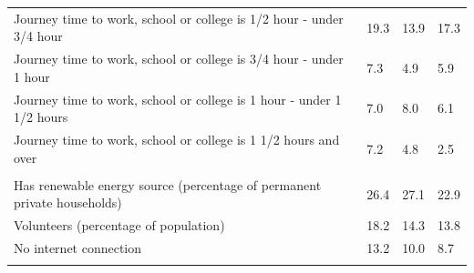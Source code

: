 \documentclass{article}
\begin{document}
\begin{table}[h]
\begin{tabular}{KTTT}
Journey time to work, school or college is 1/2 hour - under 3/4 hour & 19.3& 13.9& 17.3\\
Journey time to work, school or college is 3/4 hour - under 1 hour & 7.3& 4.9& 5.9\\
Journey time to work, school or college is 1 hour - under 1 1/2 hours & 7.0& 8.0& 6.1\\
Journey time to work, school or college is 1 1/2 hours and over & 7.2& 4.8& 2.5\\
\hline
    \\ 
    \hline
Has renewable energy source (percentage of permanent private households) & 26.4& 27.1& 22.9\\
    \hline
Volunteers (percentage of population) & 18.2& 14.3& 13.8\\
    \hline
No internet connection& 13.2& 10.0&  8.7\\
\hline
\end{tabular}
\end{table}
\end{document}
